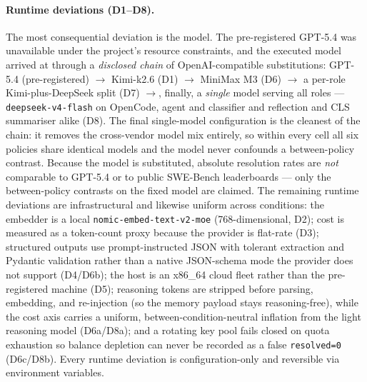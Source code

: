 \paragraph{Runtime deviations (D1--D8).}
The most consequential deviation is the model. The pre-registered GPT-5.4 was unavailable
under the project's resource constraints, and the executed model arrived at through a
\emph{disclosed chain} of OpenAI-compatible substitutions: GPT-5.4 (pre-registered) $\to$
Kimi-k2.6 (D1) $\to$ MiniMax M3 (D6) $\to$ a per-role Kimi-plus-DeepSeek split (D7) $\to$,
finally, a \emph{single} model serving all roles --- \texttt{deepseek-v4-flash} on OpenCode,
agent and classifier and reflection and CLS summariser alike (D8). The final single-model
configuration is the cleanest of the chain: it removes the cross-vendor model mix entirely,
so within every cell all six policies share identical models and the model never confounds a
between-policy contrast. Because the model is substituted, absolute resolution rates are
\emph{not} comparable to GPT-5.4 or to public SWE-Bench leaderboards --- only the
between-policy contrasts on the fixed model are claimed. The remaining runtime deviations are
infrastructural and likewise uniform across conditions: the embedder is a local
\texttt{nomic-embed-text-v2-moe} (768-dimensional, D2); cost is measured as a token-count
proxy because the provider is flat-rate (D3); structured outputs use prompt-instructed JSON
with tolerant extraction and Pydantic validation rather than a native JSON-schema mode the
provider does not support (D4/D6b); the host is an x86\_64 cloud fleet rather than the
pre-registered machine (D5); reasoning tokens are stripped before parsing, embedding, and
re-injection (so the memory payload stays reasoning-free), while the cost axis carries a
uniform, between-condition-neutral inflation from the light reasoning model (D6a/D8a); and a
rotating key pool fails closed on quota exhaustion so balance depletion can never be recorded
as a false \texttt{resolved=0} (D6c/D8b). Every runtime deviation is configuration-only and
reversible via environment variables.

